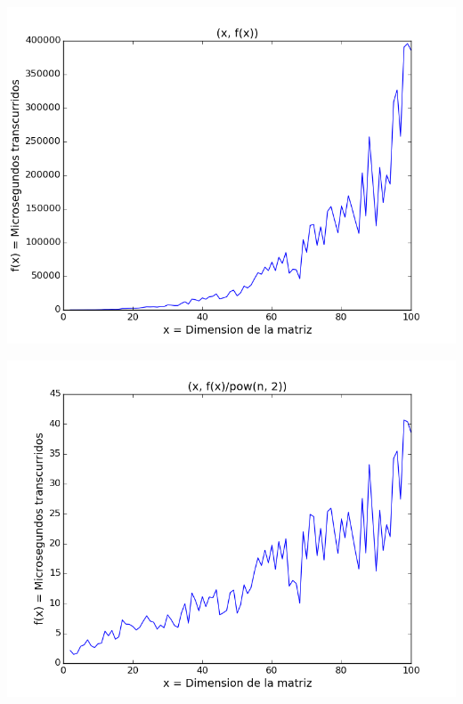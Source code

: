 \begin{center}
\includegraphics[scale=0.54]{images/0potenciafuncion}
\end{center}


\begin{center}
\includegraphics[scale=0.54]{images/0potenciasobrecuadrado}
\end{center}


